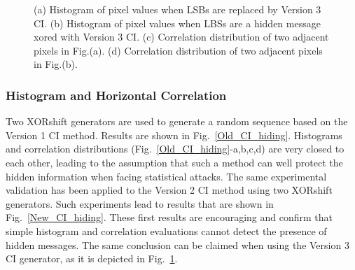 \begin{figure}
{}
\caption{ (a) Histogram of pixel values when LSBs are replaced by Version 3 CI. (b) Histogram of pixel values when LBSs are a hidden message xored with Version 3 CI. (c) Correlation distribution of two adjacent pixels in Fig.(a). (d) Correlation distribution of two adjacent pixels in Fig.(b).  }

\label{Xor_CI_hiding}
\end{figure}


\subsubsection{Histogram and Horizontal Correlation}

Two XORshift generators are used to generate a random sequence based on the Version 1 CI method. Results are shown in Fig.~\ref{Old_CI_hiding}. Histograms and correlation distributions (Fig.~\ref{Old_CI_hiding}-a,b,c,d) are very closed to each other, leading to the
assumption that such a method can well protect the hidden information when facing statistical attacks.
The same experimental validation has been applied to the Version 2 CI method using two XORshift generators.
Such experiments lead to results that are shown in Fig.~\ref{New_CI_hiding}. These first results are
encouraging and confirm that simple histogram
and correlation evaluations cannot detect the
presence of hidden messages.
The same conclusion can be claimed when using the Version 3 CI generator, as it is depicted in Fig.~\ref{Xor_CI_hiding}.

